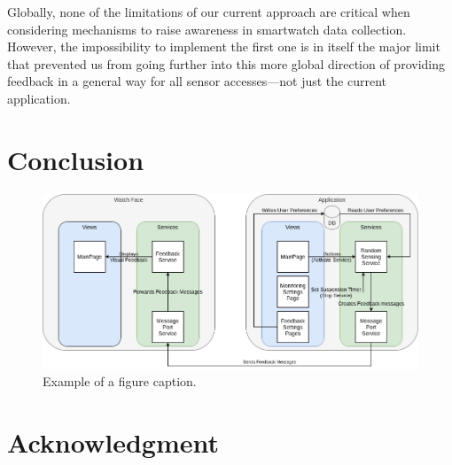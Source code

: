 \documentclass[conference, a4paper, 10pt, twocolumn]{IEEEtran}
\begin{document}
Globally, none of the limitations of our current approach are critical when considering mechanisms to raise awareness in smartwatch data collection. However, the impossibility to implement the first one is in itself the major limit that prevented us from going further into this more global direction of providing feedback in a general way for all sensor accesses---not just the current application.

\section{Conclusion}


\begin{figure}[ht]
\centerline{\includegraphics[width=1\textwidth]{img/appDiagram.png}}
\caption{Example of a figure caption.}
\label{fig}
\end{figure}

\section*{Acknowledgment}

\printbibliography
\end{document}
